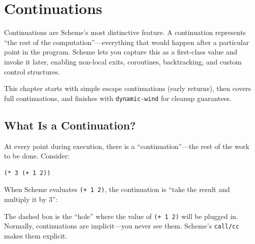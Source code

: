 \chapter{Continuations}
\label{ch:continuations}

Continuations are Scheme's most distinctive feature. A continuation represents ``the rest of the computation''---everything that would happen after a particular point in the program. Scheme lets you capture this as a first-class value and invoke it later, enabling non-local exits, coroutines, backtracking, and custom control structures.

This chapter starts with simple escape continuations (early returns), then covers full continuations, and finishes with \texttt{dynamic-wind} for cleanup guarantees.

\section{What Is a Continuation?}

At every point during execution, there is a ``continuation''---the rest of the work to be done. Consider:

\begin{lstlisting}
(* 3 (+ 1 2))
\end{lstlisting}

When Scheme evaluates \texttt{(+ 1 2)}, the continuation is ``take the result and multiply it by 3'':

\begin{center}
\end{center}

The dashed box is the ``hole'' where the value of \texttt{(+ 1 2)} will be plugged in. Normally, continuations are implicit---you never see them. Scheme's \texttt{call/cc} makes them explicit.

